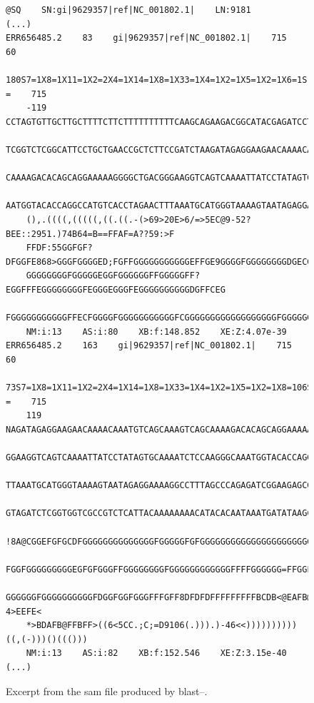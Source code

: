 \begin{figure}[H]
\begin{lstlisting}[basicstyle=\ttfamily\footnotesize,frameround=ftft,frame=trBL]
@SQ    SN:gi|9629357|ref|NC_001802.1|    LN:9181
(...)
ERR656485.2    83    gi|9629357|ref|NC_001802.1|    715    60
    180S7=1X8=1X11=1X2=2X4=1X14=1X8=1X33=1X4=1X2=1X5=1X2=1X6=1S    =	715
    -119    CCTAGTGTTGCTTGCTTTTCTTCTTTTTTTTTTCAAGCAGAAGACGGCATACGAGATCCTCTATCGAGA
    TCGGTCTCGGCATTCCTGCTGAACCGCTCTTCCGATCTAAGATAGAGGAAGAACAAAACAAATGTCAGCAAAGTCAG
    CAAAAGACACAGCAGGAAAAAGGGGCTGACGGGAAGGTCAGTCAAAATTATCCTATAGTGCAAAATCTCCAAGGGCA
    AATGGTACACCAGGCCATGTCACCTAGAACTTTAAATGCATGGGTAAAAGTAATAGAGGAAAAGGCCTTTAGCCCAN
    (),.((((,(((((,((.((.-(>69>20E>6/=>5EC@9-52?BEE::2951.)74B64=B==FFAF=A??59:>F
    FFDF:55GGFGF?DFGGFE868>GGGFGGGGED;FGFFGGGGGGGGGGGEFFGE9GGGGFGGGGGGGGDGECGGFGG
    GGGGGGGGFGGGGGEGGFGGGGGGFFGGGGGFF?EGGFFFEGGGGGGGGFEGGGEGGGFEGGGGGGGGGGDGFFCEG
    FGGGGGGGGGGGFFECFGGGGFGGGGGGGGGGGFCGGGGGGGGGGGGGGGGGGFGGGGGGGGF@CCA8!
    NM:i:13    AS:i:80    XB:f:148.852    XE:Z:4.07e-39
ERR656485.2    163    gi|9629357|ref|NC_001802.1|    715    60
    73S7=1X8=1X11=1X2=2X4=1X14=1X8=1X33=1X4=1X2=1X5=1X2=1X8=106S    =    715
    119    NAGATAGAGGAAGAACAAAACAAATGTCAGCAAAGTCAGCAAAAGACACAGCAGGAAAAAGGGGCTGACG
    GGAAGGTCAGTCAAAATTATCCTATAGTGCAAAATCTCCAAGGGCAAATGGTACACCAGGCCATGTCACCTAGAACT
    TTAAATGCATGGGTAAAAGTAATAGAGGAAAAGGCCTTTAGCCCAGAGATCGGAAGAGCGTCGTGTAGGGAAAGAGT
    GTAGATCTCGGTGGTCGCCGTCTCATTACAAAAAAAACATACACAATAAATGATATAAGCGGAATCAACAGCATGA
    !8A@CGGEFGFGCDFGGGGGGGGGGGGGGFGGGGGFGFGGGGGGGGGGGGGGGGGGGGGGGGEGGGGGGGGGGGGGG
    FGGFGGGGGGGGGEGFGFGGGFFGGGGGGGGFGGGGGGGGGGGGFFFFGGGGGG=FFGGFFDGGGGGGGG8FGFGGG
    GGGGGGFGGGGGGGGGGFDGGFGGFGGGFFFGFF8DFDFDFFFFFFFFFBCDB<@EAFB@ABAC@CDFF?4>EEFE<
    *>BDAFB@FFBFF>((6<5CC.;C;=D9106(.))).)-46<<))))))))))((,(-)))()((()))
    NM:i:13    AS:i:82    XB:f:152.546    XE:Z:3.15e-40
(...)
\end{lstlisting}
\caption{Excerpt from the \acrshort{sam} file produced by \acrshort{blast}--\blastobam{}.}
\label{fig:samBLAST}
\end{figure}

